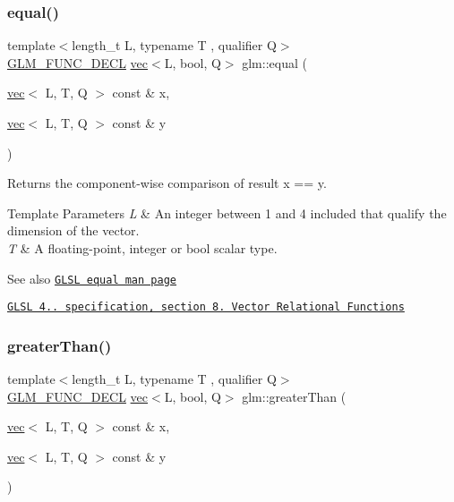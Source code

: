 \subsubsection{\texorpdfstring{equal()}{equal()}}
{\footnotesize\ttfamily template$<$length\+\_\+t L, typename T , qualifier Q$>$ \\
\hyperlink{setup_8hpp_ab2d052de21a70539923e9bcbf6e83a51}{G\+L\+M\+\_\+\+F\+U\+N\+C\+\_\+\+D\+E\+CL} \hyperlink{structglm_1_1vec}{vec}$<$L, bool, Q$>$ glm\+::equal (\begin{DoxyParamCaption}\item[{\hyperlink{structglm_1_1vec}{vec}$<$ L, T, Q $>$ const \&}]{x,  }\item[{\hyperlink{structglm_1_1vec}{vec}$<$ L, T, Q $>$ const \&}]{y }\end{DoxyParamCaption})}

Returns the component-\/wise comparison of result x == y.


\begin{DoxyTemplParams}{Template Parameters}
{\em L} & An integer between 1 and 4 included that qualify the dimension of the vector. \\
\hline
{\em T} & A floating-\/point, integer or bool scalar type.\\
\hline
\end{DoxyTemplParams}
\begin{DoxySeeAlso}{See also}
\href{http://www.opengl.org/sdk/docs/manglsl/xhtml/equal.xml}{\tt G\+L\+SL equal man page} 

\href{http://www.opengl.org/registry/doc/GLSLangSpec.4.20.8.pdf}{\tt G\+L\+SL 4.. specification, section 8. Vector Relational Functions} 
\end{DoxySeeAlso}
\mbox{\label{group__core__func__vector__relational_gad3a3a7d228da3754c328c9a778f6df56}} 
\subsubsection{\texorpdfstring{greater\+Than()}{greaterThan()}}
{\footnotesize\ttfamily template$<$length\+\_\+t L, typename T , qualifier Q$>$ \\
\hyperlink{setup_8hpp_ab2d052de21a70539923e9bcbf6e83a51}{G\+L\+M\+\_\+\+F\+U\+N\+C\+\_\+\+D\+E\+CL} \hyperlink{structglm_1_1vec}{vec}$<$L, bool, Q$>$ glm\+::greater\+Than (\begin{DoxyParamCaption}\item[{\hyperlink{structglm_1_1vec}{vec}$<$ L, T, Q $>$ const \&}]{x,  }\item[{\hyperlink{structglm_1_1vec}{vec}$<$ L, T, Q $>$ const \&}]{y }\end{DoxyParamCaption})}

